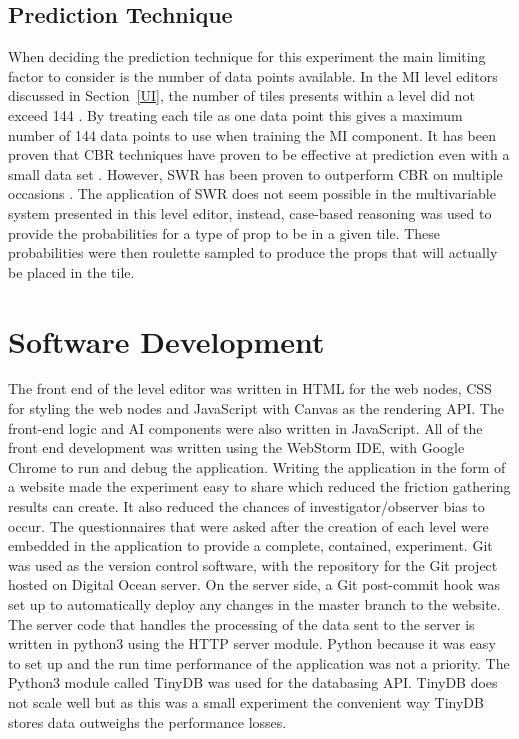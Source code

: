 \documentclass[journal]{IEEEtran}
\begin{document}
\subsection{Prediction Technique}
When deciding the prediction technique for this experiment the main limiting factor to consider is the number of data points available. In the MI level editors discussed in Section~\ref{UI},  the number of tiles presents within a level did not exceed 144 \cite{alvarez2018fostering, liapis2013sentient, baldwin2017mixed}. By treating each tile as one data point this gives a maximum number of 144 data points to use when training the MI component. It has been proven that CBR techniques have proven to be effective at prediction even with a small data set \cite{shepperd2001comparing,wen2012systematic}. However, SWR has been proven to outperform CBR on multiple occasions \cite{shepperd2001comparing, schroeder2016understanding}. The application of SWR does not seem possible in the multivariable system presented in this level editor, instead, case-based reasoning was used to provide the probabilities for a type of prop to be in a given tile. These probabilities were then roulette sampled to produce the props that will actually be placed in the tile.  

\section{Software Development}
The front end of the level editor was written in HTML for the web nodes, CSS for styling the web nodes and JavaScript with Canvas as the rendering API. The front-end logic and AI components were also written in JavaScript. 
All of the front end development was written using the WebStorm IDE, with Google Chrome to run and debug the application. Writing the application in the form of a website made the experiment easy to share which reduced the friction gathering results can create. It also reduced the chances of investigator/observer bias \cite{phillips1999double} to occur. The questionnaires that were asked after the creation of each level were embedded in the application to provide a complete, contained, experiment. Git was used as the version control software, with the repository for the Git project hosted on Digital Ocean server. On the server side, a Git post-commit hook was set up to automatically deploy any changes in the master branch to the website. The server code that handles the processing of the data sent to the server is written in python3 using the HTTP server module. Python because it was easy to set up and the run time performance of the application was not a priority. The Python3 module called TinyDB was used for the databasing API. TinyDB does not scale well but as this was a small experiment the convenient way TinyDB stores data outweighs the performance losses. 
\end{document}
